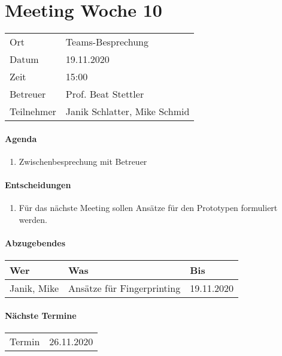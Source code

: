 \section*{Meeting Woche 10}

\begin{table}[h!]
	\begin{tabularx}{\textwidth}{l X }
		Ort & Teams-Besprechung \\
		Datum & 19.11.2020 \\
		Zeit & 15:00 \\
        Betreuer & Prof. Beat Stettler\\
		Teilnehmer & Janik Schlatter, Mike Schmid \\
	\end{tabularx}
\end{table}

\paragraph{Agenda}
\begin{enumerate}
	\item Zwischenbesprechung mit Betreuer
\end{enumerate}

\paragraph{Entscheidungen}
\begin{enumerate}
    \item Für das nächste Meeting sollen Ansätze für den Prototypen formuliert werden.
\end{enumerate}

\paragraph{Abzugebendes}
\begin{tabbing}
	\begin{tabu} to \linewidth {l X l }
        \toprule
        \textbf{Wer} & \textbf{Was} & \textbf{Bis} \\
		\midrule
		Janik, Mike & Ansätze für Fingerprinting & 19.11.2020 \\
		\bottomrule
    \end{tabu}
\end{tabbing}

\paragraph{Nächste Termine} \hfill
\begin{table}[h!]
	\begin{tabularx}{\textwidth}{l X }
		Termin & 26.11.2020 \\
	\end{tabularx}
\end{table}

\clearpage